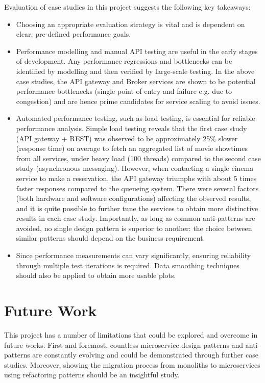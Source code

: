 Evaluation of case studies in this project suggests the following key takeaways:
\begin{itemize}
  \item Choosing an appropriate evaluation strategy is vital and is dependent on clear, pre-defined performance goals.
  \item Performance modelling and manual API testing are useful in the early stages of development. Any performance regressions and bottlenecks can be identified by modelling and then verified by large-scale testing. In the above case studies, the API gateway and Broker services are shown to be potential performance bottlenecks (single point of entry and failure e.g. due to congestion) and are hence prime candidates for service scaling to avoid issues.
  \item Automated performance testing, such as load testing, is essential for reliable performance analysis. Simple load testing reveals that the first case study (API gateway + REST) was observed to be approximately 25\% slower (response time) on average to fetch an aggregated list of movie showtimes from all services,  under heavy load (100 threads) compared to the second case study (asynchronous messaging). However, when contacting a single cinema service to make a reservation, the API gateway triumphs with about 5 times faster responses compared to the queueing system. There were several factors (both hardware and software configurations) affecting the observed results, and it is quite possible to further tune the services to obtain more distinctive results in each case study. Importantly, as long as common anti-patterns are avoided, no single design pattern is superior to another: the choice between similar patterns should depend on the business requirement.
  \item Since performance measurements can vary significantly, ensuring reliability through multiple test iterations is required. Data smoothing techniques should also be applied to obtain more usable plots.
\end{itemize}

\section{Future Work}

This project has a number of limitations that could be explored and overcome in future works. First and foremost, countless microservice design patterns and anti-patterns are constantly evolving and could be demonstrated through further case studies. Moreover, showing the migration process from monoliths to microservices using refactoring patterns should be an insightful study.

